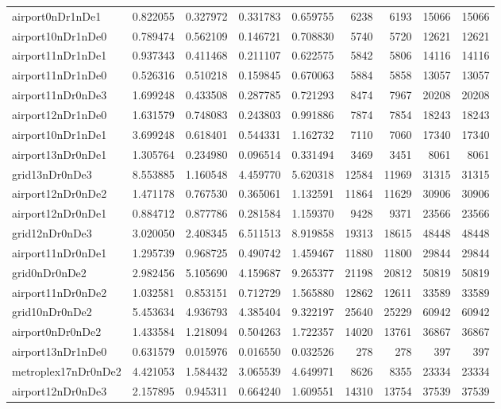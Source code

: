 \begin{longtable}{|l|r|r|r|r|r|r|r|r|}
airport0nDr1nDe1 & 0.822055 & 0.327972 & 0.331783 & 0.659755 & 6238 & 6193 & 15066 & 15066 \\
airport10nDr1nDe0 & 0.789474 & 0.562109 & 0.146721 & 0.708830 & 5740 & 5720 & 12621 & 12621 \\
airport11nDr1nDe1 & 0.937343 & 0.411468 & 0.211107 & 0.622575 & 5842 & 5806 & 14116 & 14116 \\
airport11nDr1nDe0 & 0.526316 & 0.510218 & 0.159845 & 0.670063 & 5884 & 5858 & 13057 & 13057 \\
airport11nDr0nDe3 & 1.699248 & 0.433508 & 0.287785 & 0.721293 & 8474 & 7967 & 20208 & 20208 \\
airport12nDr1nDe0 & 1.631579 & 0.748083 & 0.243803 & 0.991886 & 7874 & 7854 & 18243 & 18243 \\
airport10nDr1nDe1 & 3.699248 & 0.618401 & 0.544331 & 1.162732 & 7110 & 7060 & 17340 & 17340 \\
airport13nDr0nDe1 & 1.305764 & 0.234980 & 0.096514 & 0.331494 & 3469 & 3451 & 8061 & 8061 \\
grid13nDr0nDe3 & 8.553885 & 1.160548 & 4.459770 & 5.620318 & 12584 & 11969 & 31315 & 31315 \\
airport12nDr0nDe2 & 1.471178 & 0.767530 & 0.365061 & 1.132591 & 11864 & 11629 & 30906 & 30906 \\
airport12nDr0nDe1 & 0.884712 & 0.877786 & 0.281584 & 1.159370 & 9428 & 9371 & 23566 & 23566 \\
grid12nDr0nDe3 & 3.020050 & 2.408345 & 6.511513 & 8.919858 & 19313 & 18615 & 48448 & 48448 \\
airport11nDr0nDe1 & 1.295739 & 0.968725 & 0.490742 & 1.459467 & 11880 & 11800 & 29844 & 29844 \\
grid0nDr0nDe2 & 2.982456 & 5.105690 & 4.159687 & 9.265377 & 21198 & 20812 & 50819 & 50819 \\
airport11nDr0nDe2 & 1.032581 & 0.853151 & 0.712729 & 1.565880 & 12862 & 12611 & 33589 & 33589 \\
grid10nDr0nDe2 & 5.453634 & 4.936793 & 4.385404 & 9.322197 & 25640 & 25229 & 60942 & 60942 \\
airport0nDr0nDe2 & 1.433584 & 1.218094 & 0.504263 & 1.722357 & 14020 & 13761 & 36867 & 36867 \\
airport13nDr1nDe0 & 0.631579 & 0.015976 & 0.016550 & 0.032526 & 278 & 278 & 397 & 397 \\
metroplex17nDr0nDe2 & 4.421053 & 1.584432 & 3.065539 & 4.649971 & 8626 & 8355 & 23334 & 23334 \\
airport12nDr0nDe3 & 2.157895 & 0.945311 & 0.664240 & 1.609551 & 14310 & 13754 & 37539 & 37539 \\

\end{longtable}
